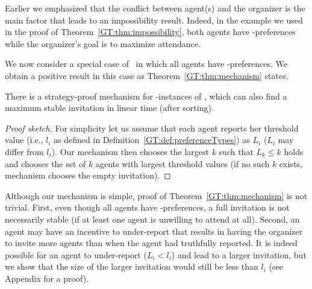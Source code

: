 
Earlier we emphasized that the conflict between agent(s) and the organizer is the main factor that leads to an impossibility result. 
Indeed, in the example we used in the proof of Theorem~\ref{GT:thm:impossibility}, both agents have \DEC-preferences while the organizer's goal is to maximize attendance.

We now consider a special case of \ASIP\ in which all agents have \INC-preferences.
We obtain a positive result in this case as Theorem~\ref{GT:thm:mechanism} states. 

\begin{theorem} \label{GT:thm:mechanism}
	There is a strategy-proof mechanism for \INC-instances of \ASIP, which can also find a maximum stable invitation in linear time (after sorting). 
\end{theorem}
\begin{proof}[Proof sketch]
For simplicity let us assume that each agent reports her threshold value (i.e., $l_i$ as defined in Definition~\ref{GT:def:preferenceTypes}) as $L_i$ ($L_i$ may differ from $l_i$). 
Our mechanism then chooses the largest $k$ such that $L_k \leq k$ holds and chooses the set of $k$ agents with largest threshold values (if no such $k$ exists, mechanism chooses the empty invitation). 
\end{proof}
	Although our mechanism is simple, proof of Theorem~\ref{GT:thm:mechanism} is not trivial. First, even though all agents have \INC-preferences, a full invitation is not necessarily stable (if at least one agent is unwilling to attend at all). Second, an agent may have an incentive to under-report that results in having the organizer to invite more agents than when the agent had truthfully reported. It is indeed possible for an agent to under-report ($L_i < l_i$) and lead to a larger invitation, but we show that the size of the larger invitation would still be less than $l_i$ (see Appendix for a proof). 


